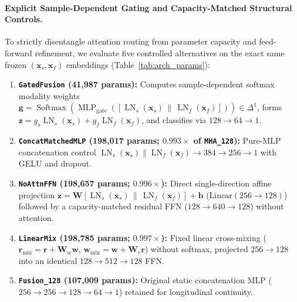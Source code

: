 \documentclass[fleqn,10pt]{wlscirep}
\begin{document}
\paragraph{Explicit Sample-Dependent Gating and Capacity-Matched Structural Controls.}
To strictly disentangle attention routing from parameter capacity and feed-forward refinement, we evaluate five controlled alternatives on the exact same frozen $(\mathbf{x}_s, \mathbf{x}_f)$ embeddings (Table~\ref{tab:arch_params}):
\begin{enumerate}
    \item \textbf{\texttt{GatedFusion} (41,987 params):} Computes sample-dependent softmax modality weights $\mathbf{g} = \operatorname{Softmax}\!\left(\operatorname{MLP}_{\text{gate}}([\operatorname{LN}_s(\mathbf{x}_s)\,\|\,\operatorname{LN}_f(\mathbf{x}_f)])\right) \in \Delta^1$, forms $\mathbf{z} = g_s \operatorname{LN}_s(\mathbf{x}_s) + g_f \operatorname{LN}_f(\mathbf{x}_f)$, and classifies via $128 \to 64 \to 1$.
    \item \textbf{\texttt{ConcatMatchedMLP} (198,017 params; $0.993\times$ of \texttt{MHA\_128}):} Pure-MLP concatenation control $\operatorname{LN}_s(\mathbf{x}_s)\|\operatorname{LN}_f(\mathbf{x}_f) \to 384 \to 256 \to 1$ with GELU and dropout.
    \item \textbf{\texttt{NoAttnFFN} (198,657 params; $0.996\times$):} Direct single-direction affine projection $\mathbf{z} = \mathbf{W}[\operatorname{LN}_s(\mathbf{x}_s)\,\|\,\operatorname{LN}_f(\mathbf{x}_f)] + \mathbf{b}$ ($\text{Linear}(256\to 128)$) followed by a capacity-matched residual FFN ($128 \to 640 \to 128$) without attention.
    \item \textbf{\texttt{LinearMix} (198,785 params; $0.997\times$):} Fixed linear cross-mixing ($\mathbf{r}_{\text{mix}} = \mathbf{r} + \mathbf{W}_w \mathbf{w}$, $\mathbf{w}_{\text{mix}} = \mathbf{w} + \mathbf{W}_r \mathbf{r}$) without softmax, projected $256 \to 128$ into an identical $128 \to 512 \to 128$ FFN.
    \item \textbf{\texttt{Fusion\_128} (107,009 params):} Original static concatenation MLP ($256 \to 256 \to 128 \to 64 \to 1$) retained for longitudinal continuity.
\end{enumerate}
\end{document}
